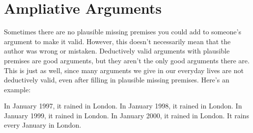 %
%
%
%
%
%
%
%
%
%


\section{Ampliative Arguments}
Sometimes there are no plausible missing premises you could add to someone's argument to make it valid.
However, this doesn't necessarily mean that the author was wrong or mistaken.
Deductively valid arguments with plausible premises are good arguments, but they aren't the only good arguments there are. This is just as well, since many arguments we give in our everyday lives are not deductively valid, even after filling in plausible missing premises. Here's an example:
	\begin{earg}
		\prem In January 1997, it rained in London.
		\prem In January 1998, it rained in London.
		\prem In January 1999, it rained in London.
		\prem In January 2000, it rained in London.
	\conc It rains every January in London.
\end{earg}

